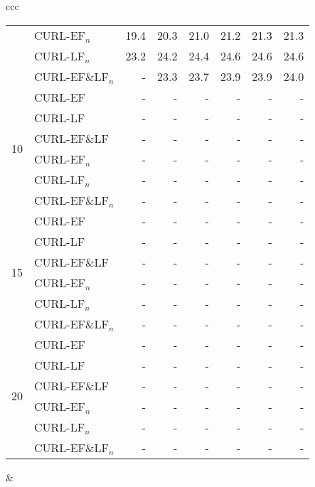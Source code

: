 \documentclass[journal,11pt]{IEEEtran}
\begin{document}
\begin{center}
{\begin{tabular}{ccc}
\begin{tabular}{|r|l|rrrrrr|}
& CURL-EF$_n$ & 19.4 & 20.3 & 21.0 & 21.2 & 21.3 & 21.3 \\
& CURL-LF$_n$ & 23.2 & 24.2 & 24.4 & 24.6 & 24.6 & 24.6 \\
& CURL-EF\&LF$_n$ & - & 23.3 & 23.7 & 23.9 & 23.9 & 24.0 \\
\hline
\multirow{6}{*}{10}
& CURL-EF & - & - & - & - & - & - \\
& CURL-LF & - & - & - & - & - & - \\
& CURL-EF\&LF & - & - & - & - & - & - \\
& CURL-EF$_n$ & - & - & - & - & - & - \\
& CURL-LF$_n$ & - & - & - & - & - & - \\
& CURL-EF\&LF$_n$ & - & - & - & - & - & - \\
\hline
\multirow{6}{*}{15}
& CURL-EF & - & - & - & - & - & - \\
& CURL-LF & - & - & - & - & - & - \\
& CURL-EF\&LF & - & - & - & - & - & - \\
& CURL-EF$_n$ & - & - & - & - & - & - \\
& CURL-LF$_n$ & - & - & - & - & - & - \\
& CURL-EF\&LF$_n$ & - & - & - & - & - & - \\
\hline
\multirow{6}{*}{20}
& CURL-EF & - & - & - & - & - & - \\
& CURL-LF & - & - & - & - & - & - \\
& CURL-EF\&LF & - & - & - & - & - & - \\
& CURL-EF$_n$ & - & - & - & - & - & - \\
& CURL-LF$_n$ & - & - & - & - & - & - \\
& CURL-EF\&LF$_n$ & - & - & - & - & - & - \\
\hline
\end{tabular}

&


\end{tabular}}
\end{center}
\end{document}

